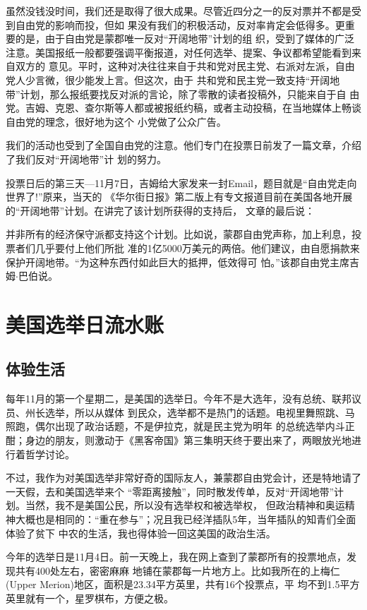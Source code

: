﻿\documentclass[11pt]{article}
\begin{document}
虽然没钱没时间，我们还是取得了很大成果。尽管近四分之一的反对票并不都是受到自由党的影响而投，但如
果没有我们的积极活动，反对率肯定会低得多。更重要的是，由于自由党是蒙郡唯一反对``开阔地带''计划的组
织，受到了媒体的广泛注意。美国报纸一般都要强调平衡报道，对任何选举、提案、争议都希望能看到来自双方的
意见。平时，这种对决往往来自于共和党对民主党、右派对左派，自由党人少言微，很少能发上言。但这次，由于
共和党和民主党一致支持``开阔地带''计划，那么报纸要找反对派的言论，除了零散的读者投稿外，只能来自于自
由党。吉姆、克恩、查尔斯等人都或被报纸约稿，或者主动投稿，在当地媒体上畅谈自由党的理念，很好地为这个
小党做了公众广告。

我们的活动也受到了全国自由党的注意。他们专门在投票日前发了一篇文章，介绍了我们反对``开阔地带''计
划的努力。

投票日后的第三天---11月7日，吉姆给大家发来一封Email，题目就是``自由党走向世界了!''原来，当天的
《华尔街日报》第二版上有专文报道目前在美国各地开展的``开阔地带''计划。在讲完了该计划所获得的支持后，
文章的最后说：

并非所有的经济保守派都支持这个计划。比如说，蒙郡自由党声称，加上利息，投票者们几乎要付上他们所批
准的1亿5000万美元的两倍。他们建议，由自愿捐款来保护开阔地带。``为这种东西付如此巨大的抵押，低效得可
怕。''该郡自由党主席吉姆$\cdot$巴伯说。

\section{美国选举日流水账}

\subsection{体验生活}

每年11月的第一个星期二，是美国的选举日。今年不是大选年，没有总统、联邦议员、州长选举，所以从媒体
到民众，选举都不是热门的话题。电视里舞照跳、马照跑，偶尔出现了政治话题，不是伊拉克，就是民主党为明年
的总统选举内斗正酣；身边的朋友，则激动于《黑客帝国》第三集明天终于要出来了，两眼放光地进行着哲学讨论。

不过，我作为对美国选举非常好奇的国际友人，兼蒙郡自由党会计，还是特地请了一天假，去和美国选举来个
``零距离接触''，同时散发传单，反对``开阔地带''计划。当然，我不是美国公民，所以没有选举权和被选举权，
但政治精神和奥运精神大概也是相同的：``重在参与''；况且我已经洋插队5年，当年插队的知青们全面体验了贫下
中农的生活，我也得体验一回这美国的政治生活。

今年的选举日是11月4日。前一天晚上，我在网上查到了蒙郡所有的投票地点，发现共有400处左右，密密麻麻
地铺在蒙郡每一片地方上。比如我所在的上梅仁(Upper Merion)地区，面积是23.34平方英里，共有16个投票点，平
均不到1.5平方英里就有一个，星罗棋布，方便之极。
\end{document}
